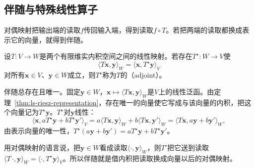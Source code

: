 \subsection{伴随与特殊线性算子}
对偶映射把输出端的读取$f$传回输入端，得到读取$f\circ T$。若把两端的读取都换成表示它的向量，就得到伴随。
\begin{definition}[伴随]
\label{def:linear-algebra-adjoint}
设$T:V\to W$是两个有限维实内积空间之间的线性映射。若存在$T^\star:W\to V$使
\begin{equation}
 \langle T\bm x,\bm y\rangle_W=\langle\bm x,T^\star\bm y\rangle_V
 \label{eq:ls-adjoint-pairing}
\end{equation}
对所有$\bm x\in V$、$\bm y\in W$成立，则$T^\star$称为$T$的（adjoint）。
\end{definition}

伴随总存在且唯一。固定$\bm y\in W$，$\bm x\mapsto\langle T\bm x,\bm y\rangle_W$是$V$上的线性泛函。由定理~\ref{thm:ls-riesz-representation}，存在唯一的向量使它写成与该向量的内积，把这个向量记为$T^\star\bm y$。$T^\star$对$\bm y$线性：
\[
 \langle\bm x,aT^\star\bm y+bT^\star\bm y'\rangle_V=a\langle T\bm x,\bm y\rangle_W+b\langle T\bm x,\bm y'\rangle_W=\langle T\bm x,a\bm y+b\bm y'\rangle_W,
\]
由表示向量的唯一性，$T^\star(a\bm y+b\bm y')=aT^\star\bm y+bT^\star\bm y'$。

用对偶映射的语言说，把$\bm y\in W$看成读取$\langle\cdot,\bm y\rangle_W$，则$T'$把它送到读取$\langle T\,\cdot,\bm y\rangle_W=\langle\cdot,T^\star\bm y\rangle_V$。所以伴随就是借内积把读取换成向量以后的对偶映射。

